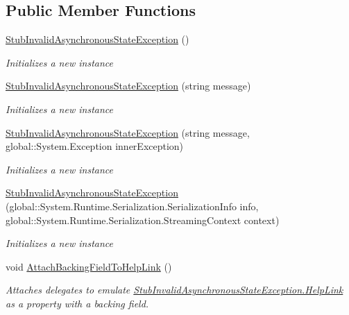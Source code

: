 \subsection*{Public Member Functions}
\begin{DoxyCompactItemize}
\item 
\hyperlink{class_system_1_1_component_model_1_1_fakes_1_1_stub_invalid_asynchronous_state_exception_ae49e9b7f130ac5fd38d7fd03757b0b32}{Stub\-Invalid\-Asynchronous\-State\-Exception} ()
\begin{DoxyCompactList}\small\item\em Initializes a new instance\end{DoxyCompactList}\item 
\hyperlink{class_system_1_1_component_model_1_1_fakes_1_1_stub_invalid_asynchronous_state_exception_a772943a87b5399dfb9ba1d65ca9decb2}{Stub\-Invalid\-Asynchronous\-State\-Exception} (string message)
\begin{DoxyCompactList}\small\item\em Initializes a new instance\end{DoxyCompactList}\item 
\hyperlink{class_system_1_1_component_model_1_1_fakes_1_1_stub_invalid_asynchronous_state_exception_a044f0341ec91ecfdd3a978b492478192}{Stub\-Invalid\-Asynchronous\-State\-Exception} (string message, global\-::\-System.\-Exception inner\-Exception)
\begin{DoxyCompactList}\small\item\em Initializes a new instance\end{DoxyCompactList}\item 
\hyperlink{class_system_1_1_component_model_1_1_fakes_1_1_stub_invalid_asynchronous_state_exception_afd175eeca4562595343268e67d7b999a}{Stub\-Invalid\-Asynchronous\-State\-Exception} (global\-::\-System.\-Runtime.\-Serialization.\-Serialization\-Info info, global\-::\-System.\-Runtime.\-Serialization.\-Streaming\-Context context)
\begin{DoxyCompactList}\small\item\em Initializes a new instance\end{DoxyCompactList}\item 
void \hyperlink{class_system_1_1_component_model_1_1_fakes_1_1_stub_invalid_asynchronous_state_exception_aadd813b088785f37364b9f1b2ad48771}{Attach\-Backing\-Field\-To\-Help\-Link} ()
\begin{DoxyCompactList}\small\item\em Attaches delegates to emulate \hyperlink{class_system_1_1_component_model_1_1_fakes_1_1_stub_invalid_asynchronous_state_exception_ab78e0152e61c837058f32785ced766a2}{Stub\-Invalid\-Asynchronous\-State\-Exception.\-Help\-Link} as a property with a backing field.\end{DoxyCompactList}\item 

\end{DoxyCompactItemize}
